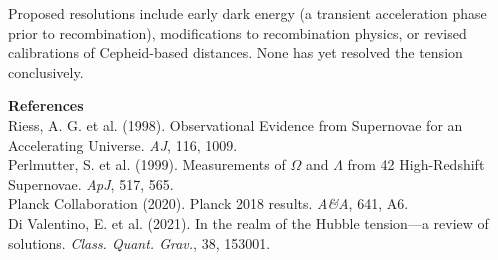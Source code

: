 \begin{technical}
Proposed resolutions include early dark energy (a transient acceleration phase prior to recombination), modifications to recombination physics, or revised calibrations of Cepheid-based distances. None has yet resolved the tension conclusively.

\medskip

\noindent\textbf{References} \\
Riess, A. G. et al. (1998). Observational Evidence from Supernovae for an Accelerating Universe. \textit{AJ}, 116, 1009.\\
Perlmutter, S. et al. (1999). Measurements of \(\Omega\) and \(\Lambda\) from 42 High-Redshift Supernovae. \textit{ApJ}, 517, 565.\\
Planck Collaboration (2020). Planck 2018 results. \textit{A\&A}, 641, A6.\\
Di Valentino, E. et al. (2021). In the realm of the Hubble tension—a review of solutions. \textit{Class. Quant. Grav.}, 38, 153001.
\end{technical}
